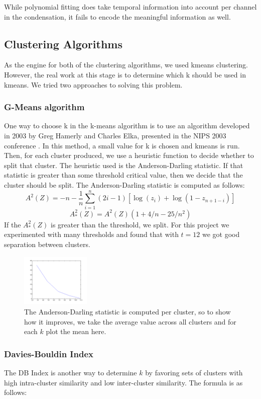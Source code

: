 \documentclass{acm_proc_article-sp}
\begin{document}
While polynomial fitting does take temporal information into
account per channel in the condensation, it fails to encode the
meaningful information as well.

\subsection{Clustering Algorithms}
As the engine for both of the clustering algorithms, we used kmeans
clustering. However, the real work at this stage is to determine which k
should be used in kmeans. We tried two approaches to solving this
problem. 

\subsubsection{G-Means algorithm}
One way to choose k in the k-means algorithm is to use an algorithm
developed in 2003 by Greg Hamerly and Charles Elka, presented in the NIPS
2003 conference \cite{gmeans}. In this method, a small value for k is
chosen and kmeans is run. Then, for each cluster produced, we use a
heuristic function to decide whether to split that cluster. The heuristic
used is the Anderson-Darling statistic. If that statistic is greater than
some threshold critical value, then we decide that the cluster should be
split. The Anderson-Darling statistic is computed as follows:
$$
A^2(Z) = -n - \frac{1}{n}\sum_{i=1}^n (2i -
1)[\log(z_i)+\log(1-z_{n+1-i})]
$$$$
A^2_*(Z) = A^2(Z)(1 + 4/n - 25/n^2)
$$
If the $A^2_*(Z)$ is greater than the threshold, we split. For this
project we experimented with many thresholds and found that with $t=12$ we
got good separation between clusters.

\begin{figure}
\centering
\includegraphics[width=1.3in,height=1in]{../poster/images/gmeans_k_vs_metric.png} 
\caption{The Anderson-Darling statistic is computed per cluster, so to
  show how it improves, we take the average value across all clusters and
  for each $k$ plot the mean here.}
\end{figure}


\subsubsection{Davies-Bouldin Index}
The DB Index is
another way to determine $k$ by favoring sets of clusters
with high intra-cluster similarity and low inter-cluster
similarity.  The formula is as follows:
\end{document}
